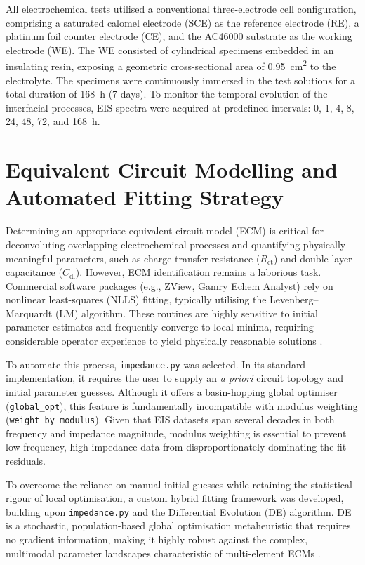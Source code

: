 \documentclass[11pt,twoside,a4paper,final]{report}
\begin{document}
All electrochemical tests utilised a conventional three-electrode cell configuration, comprising a saturated calomel electrode (SCE) as the reference electrode (RE), a platinum foil counter electrode (CE), and the AC46000 substrate as the working electrode (WE). The WE consisted of cylindrical specimens embedded in an insulating resin, exposing a geometric cross-sectional area of \qty{0.95}{\square\centi\meter} to the electrolyte. The specimens were continuously immersed in the test solutions for a total duration of \qty{168}{\hour} (7 days). To monitor the temporal evolution of the interfacial processes, EIS spectra were acquired at predefined intervals: 0, 1, 4, 8, 24, 48, 72, and \qty{168}{\hour}.

\section{Equivalent Circuit Modelling and Automated Fitting Strategy}
\label{sec:fitting_software}

Determining an appropriate equivalent circuit model (ECM) is critical for deconvoluting overlapping electrochemical processes and quantifying physically meaningful parameters, such as charge-transfer resistance ($R_{\text{ct}}$) and double layer capacitance ($C_{\text{dl}}$). However, ECM identification remains a laborious task. Commercial software packages (e.g., ZView, Gamry Echem Analyst) rely on nonlinear least-squares (NLLS) fitting, typically utilising the Levenberg--Marquardt (LM) algorithm. These routines are highly sensitive to initial parameter estimates and frequently converge to local minima, requiring considerable operator experience to yield physically reasonable solutions \cite{GamryEISModeling, Zou2023}.

To automate this process, \texttt{impedance.py} \cite{Murbach2020} was selected. In its standard implementation, it requires the user to supply an \textit{a priori} circuit topology and initial parameter guesses. Although it offers a basin-hopping global optimiser (\texttt{global\_opt}), this feature is fundamentally incompatible with modulus weighting (\texttt{weight\_by\_modulus}). Given that EIS datasets span several decades in both frequency and impedance magnitude, modulus weighting is essential to prevent low-frequency, high-impedance data from disproportionately dominating the fit residuals.

To overcome the reliance on manual initial guesses while retaining the statistical rigour of local optimisation, a custom hybrid fitting framework was developed, building upon \texttt{impedance.py} and the Differential Evolution (DE) algorithm. DE is a stochastic, population-based global optimisation metaheuristic that requires no gradient information, making it highly robust against the complex, multimodal parameter landscapes characteristic of multi-element ECMs \cite{Ahmad2022, Storn1997, Leite2022}.
\end{document}
